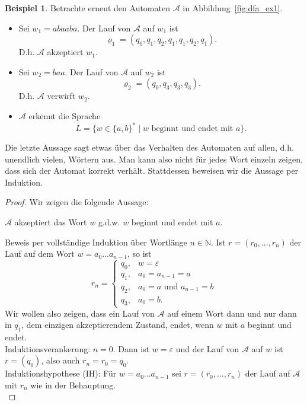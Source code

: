 \documentclass[11pt, a4paper]{article}
\theoremstyle{definition}
\newtheorem{example}[definition]{Beispiel}
\theoremstyle{plain}
\numberwithin{equation}{section}
\begin{document}
\begin{example}\label{exp:ex1}
	Betrachte erneut den Automaten \( \mathcal{A} \) in Abbildung~\ref{fig:dfa_ex1}.
	\begin{itemize}
		\item Sei \( w_1 = abaaba \). Der Lauf von \( \mathcal{A} \) auf \( w_1 \) ist
			\[
				\varrho_1 = (q_0, q_1, q_2, q_1, q_1, q_2, q_1).
			\]
			D.h. \( \mathcal{A} \) akzeptiert \( w_1 \).
		\item Sei \( w_2 = baa \). Der Lauf von \( \mathcal{A} \) auf \( w_2 \) ist
			\[
				\varrho_2 = (q_0, q_3, q_3, q_3).
			\]
			D.h. \( \mathcal{A} \) verwirft \( w_2 \).
		\item \( \mathcal{A} \) erkennt die Sprache 
			\[
				L = \{ w \in \{a, b\}^\ast \mid w \text{ beginnt und endet mit } a \}.
			\]
	\end{itemize}
	Die letzte Aussage sagt etwas über das Verhalten des Automaten auf allen, d.h. unendlich vielen, Wörtern aus. Man kann also nicht für jedes Wort einzeln zeigen, dass sich der Automat korrekt verhält. Stattdessen beweisen wir die Aussage per Induktion.
	\begin{proof}
		Wir zeigen die folgende Aussage:
		\begin{center}
			\( \mathcal{A} \) akzeptiert das Wort \( w \) {g.d.w.} \( w \) beginnt und endet mit \( a \).				\end{center}
		Beweis per vollständige Induktion über Wortlänge \( n \in \mathbb{N} \). Ist \( r = (r_0, \ldots, r_n) \) der Lauf auf dem Wort \( w = a_0 \ldots a_{n-1} \), so ist
		\[
			r_n = \left\lbrace 
					\begin{array}{ll}
						q_0, & w = \varepsilon\\
						q_1, & a_0 = a_{n-1} = a\\
						q_2, & a_0 = a \text{ und } a_{n-1} = b\\
						q_3, & a_0 = b.
					\end{array}
				\right.
		\]
		Wir wollen also zeigen, dass ein Lauf von \( \mathcal{A} \) auf einem Wort dann und nur dann in \( q_1 \), dem einzigen akzeptierendem Zustand, endet, wenn \( w \) mit \( a \) beginnt und endet.\\
		Induktionsverankerung: \( n = 0 \). Dann ist \( w = \varepsilon \) und der Lauf von \( \mathcal{A} \) auf \( w \) ist \( r = (q_0) \), also auch \( r_n = r_0 = q_0 \).\checkmark\\
		Induktionshypothese (IH): Für \( w = a_0 \ldots a_{n-1} \) sei \( r = (r_0, \ldots, r_n) \) der Lauf auf \( \mathcal{A} \) mit \( r_n \) wie in der Behauptung.\\

\end{proof}
\end{example}
\end{document}
